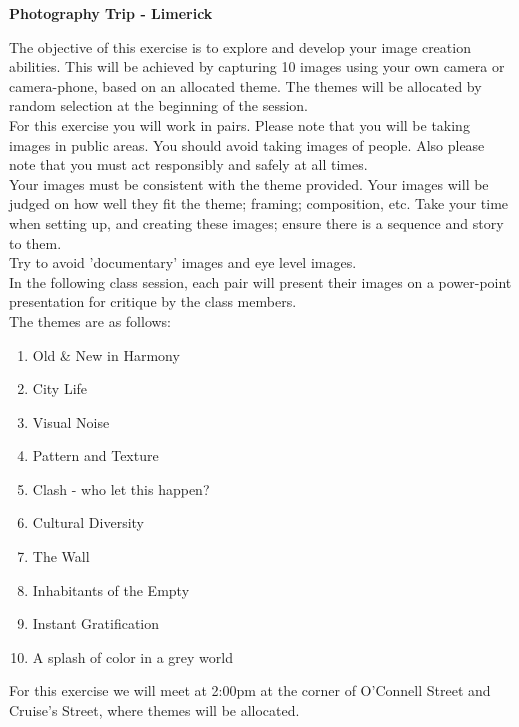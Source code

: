 
	
\begin{flushleft}
\Large\textbf{Photography Trip - Limerick }\\
\end{flushleft}

The objective of this exercise is to explore and develop your image creation abilities.  This will be achieved by capturing 10 images using your own camera or camera-phone, based on an allocated theme.  The themes will be allocated by random selection at the beginning of the session.\\

For this exercise you will work in pairs.  Please note that you will be taking images in public areas.  You should avoid taking images of people.  Also please note that you must act responsibly and safely at all times.\\

Your images must be consistent with the theme provided. Your images will be judged on how well they fit the theme; framing; composition, etc. Take your
time when setting up, and creating these images; ensure there is a sequence and story to them.\\

Try to avoid ’documentary’ images and eye level images.\\

In the following class session, each pair will present their images on a power-point presentation for critique by the class members.\\

The themes are as follows:

\begin{enumerate}
	\item Old \& New in Harmony
	\item City Life
	\item Visual Noise
	\item Pattern and Texture
	\item Clash - who let this happen?
	\item Cultural Diversity
	\item The Wall
	\item Inhabitants of the Empty
	\item Instant Gratification
	\item A splash of color in a grey world
\end{enumerate}

For this exercise we will meet at 2:00pm at the corner of O'Connell Street and Cruise's Street, where themes will be allocated.\\

